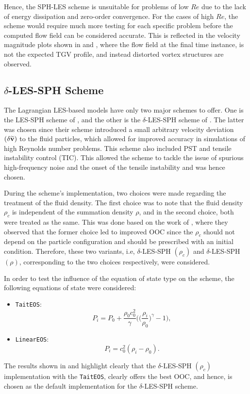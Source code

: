 Hence, the SPH-LES scheme is unsuitable for problems of low $Re$ due to the lack of energy dissipation and zero-order convergence. For the cases of high $Re$, the scheme would require much more testing for each specific problem before the computed flow field can be considered accurate. This is reflected in the velocity magnitude plots shown in  and , where the flow field at the final time instance, is not the expected TGV profile, and instead distorted vortex structures are observed.


\subsection[delta-LES-SPH Scheme]{$\delta$-LES-SPH Scheme}
The Lagrangian LES-based models have only two major schemes to offer. One is the LES-SPH scheme of \cite{DiMascio2017}, and the other is the $\delta$-LES-SPH scheme of \cite{Colagrossi2021QuasiLagrangian}.
The latter was chosen since their scheme introduced a small arbitrary velocity deviation $(\delta\widetilde{\mathbf{v}})$ to the fluid particles, which allowed for improved accuracy in simulations of high Reynolds number problems. This scheme also included PST and tensile instability control (TIC). This allowed the scheme to tackle the issue of spurious high-frequency noise and the onset of the tensile instability and was hence chosen.

During the scheme's implementation, two choices were made regarding the treatment of the fluid density. The first choice was to note that the fluid density $\rho_c$ is independent of the summation density $\rho$, and in the second choice, both were treated as the same. This was done based on the work of \cite{Negi2022Techniques}, where they observed that the former choice led to improved OOC since the $\rho_c$ should not depend on the particle configuration and should be prescribed with an initial condition. Therefore, these two variants, i.e, $\delta$-LES-SPH $(\rho_c)$ and $\delta$-LES-SPH $(\rho)$, corresponding to the two choices respectively, were considered.

In order to test the influence of the equation of state type on the scheme, the following equations of state were considered:
\begin{itemize}
  \item \texttt{TaitEOS}:
  \begin{equation}
    P_i = P_0 + \frac{\rho_0 c_0^2}{\gamma} \bigg( \Big( \frac{\rho_i}{\rho_0} \Big)^{\gamma} - 1 \bigg),
  \end{equation}

  \item \texttt{LinearEOS}:
  \begin{equation}
    P_i = c_0^2 (\rho_i - \rho_0).
  \end{equation}
\end{itemize}
The results shown in  and  highlight clearly that the $\delta$-LES-SPH $(\rho_c)$ implementation with the \texttt{TaitEOS}, clearly offers the best OOC, and hence, is chosen as the default implementation for the $\delta$-LES-SPH scheme.

